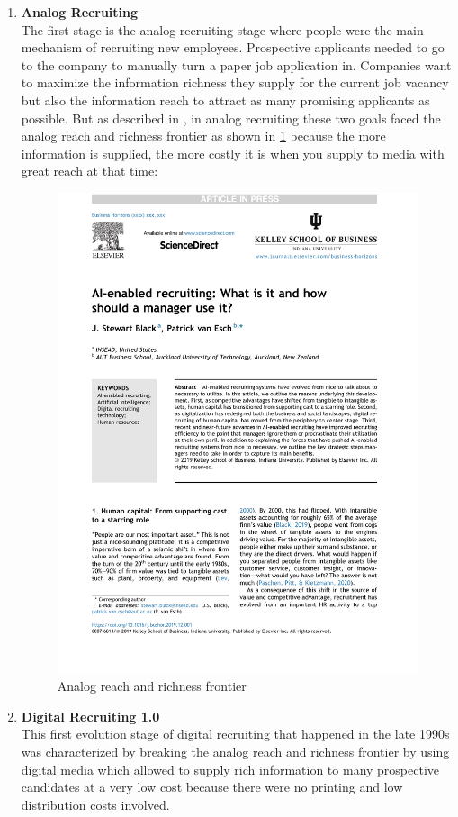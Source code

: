 \documentclass[draft,final]{thesisclass} %
\begin{document}
\begin{enumerate}
    \item \textbf{Analog Recruiting} \label{analog_recruting}\\
    The first stage is the analog recruiting stage where people were the main mechanism of recruiting new employees.
    Prospective applicants needed to go to the company to manually turn a paper job application in.
    Companies want to maximize the information richness they supply for the current job vacancy but also the information reach to attract as many promising applicants as possible.
    But as described in \textcite[2]{ai_recruiting}, in analog recruiting these two goals faced the analog reach and richness frontier as shown in \ref{fig:analog_reach_richness_frontier} because the more information is supplied, the more costly it is when you supply to media with great reach at that time:
    \begin{figure}[H]
        \centering
        \includegraphics[scale=0.5,page=2,width=0.6\linewidth,trim={300 100 55 515},clip]{literature/ai_recruiting.pdf}
        \caption{Analog reach and richness frontier \parencite[2]{ai_recruiting}}
        \label{fig:analog_reach_richness_frontier}
    \end{figure}
    \item \textbf{Digital Recruiting 1.0} \label{digital_recruiting_1}\\
    This first evolution stage of digital recruiting that happened in the late 1990s was characterized by breaking the analog reach and richness frontier by using digital media which allowed to supply rich information to many prospective candidates at a very low cost because there were no printing and low distribution costs involved.

\end{enumerate}
\end{document}
